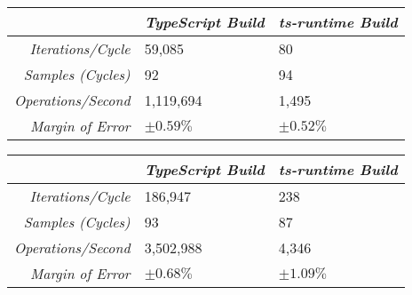 \begin{center}
{
\centering
\tabulinesep=1.2mm
\setlength{\tabcolsep}{5mm}
\def\arraystretch{1.25}
\small
\begin{tabu} to \textwidth {|r||X[c,m]|X[c,m]|}
  \hline
  & \emph{TypeScript Build} & \emph{ts-runtime Build} \\
  \hline
  \hline
  \emph{Iterations/Cycle}  & 59,085 & 80 \\
  \hline
  \emph{Samples (Cycles)}  & 92 & 94 \\
  \hline
  \emph{Operations/Second} & 1,119,694 & 1,495 \\
  \hline
  \emph{Margin of Error}   & $\pm 0.59\%$ & $\pm 0.52\%$ \\
  \hline
\end{tabu}
}
\end{center}

\begin{center}
{
\centering
\tabulinesep=1.2mm
\setlength{\tabcolsep}{5mm}
\def\arraystretch{1.25}
\small
\begin{tabu} to \textwidth {|r||X[c,m]|X[c,m]|}
  \hline
  & \emph{TypeScript Build} & \emph{ts-runtime Build} \\
  \hline
  \hline
  \emph{Iterations/Cycle}  & 186,947 & 238 \\
  \hline
  \emph{Samples (Cycles)}  & 93 & 87 \\
  \hline
  \emph{Operations/Second} & 3,502,988 & 4,346 \\
  \hline
  \emph{Margin of Error}   & $\pm 0.68\%$ & $\pm 1.09\%$ \\
  \hline
\end{tabu}
}
\end{center}
